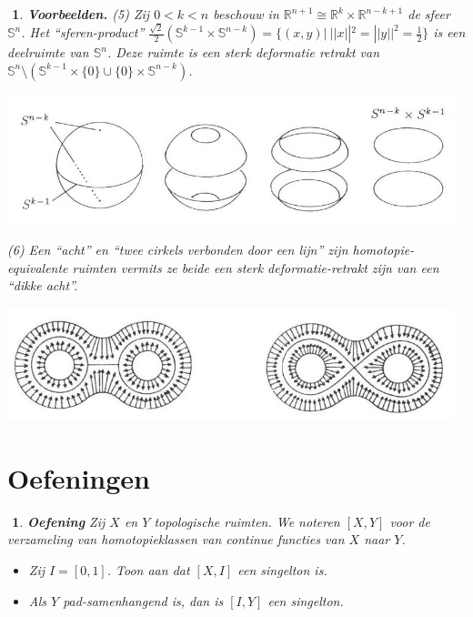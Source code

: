 \documentclass[12pt]{book}
\newcommand{\R}{\mathbb{R}}
\newtheorem{vbnh}[stelh]{$\!\!$}
\newenvironment{vbn}{\begin{vbnh} \em {\bf Voorbeelden.}}{\end{vbnh}}
\newtheorem{eoef}{$\!\!$}[chapter]
\newenvironment{oef}{\begin{eoef} {\bf Oefening}}{\end{eoef}}
\begin{document}
\begin{vbn}
(5) 
Zij $0<k<n$ beschouw in $\R^{n+1}\cong \R^{k}\times \R^{n-k+1}$ de sfeer $\mathbb{S}^{n}$.
Het ``sferen-product'' $\frac{\sqrt{2}}{2}(\mathbb{S}^{k-1}\times \mathbb{S}^{n-k}) =\{(x,y)| \ || x ||^{2}=||y ||^{2}=\frac{1}{2}\}$ is een deelruimte van $\mathbb{S}^{n}$.
Deze ruimte is een sterk deformatie retrakt van $\mathbb{S}^{n}\setminus (\mathbb{S}^{k-1}\times \{0\}\cup \{0\}\times \mathbb{S}^{n-k})$.

\begin{center}
\includegraphics[width=13cm]{images/halfsferen.JPG}
\end{center}


(6)
Een ``acht'' en ``twee cirkels verbonden door een lijn'' zijn homotopie-equivalente ruimten vermits ze beide een sterk deformatie-retrakt zijn van een ``dikke acht''.

\begin{center}
\includegraphics[width=13cm]{images/acht.JPG}
\end{center} 


%
\end{vbn}
%
\section*{Oefeningen}


\begin{oef} Zij $X$ en $Y$ topologische ruimten. We noteren $[X,Y]$ voor de verzameling van homotopieklassen van continue functies van $X$ naar $Y$.

\begin{itemize}
\item[(a)] Zij $I=[0,1]$. Toon aan dat $[X,I]$ een singelton is.
\item[(b)] Als $Y$ pad-samenhangend is, dan is $[I,Y]$ een singelton.
\end{itemize}
\end{oef}
\end{document}
